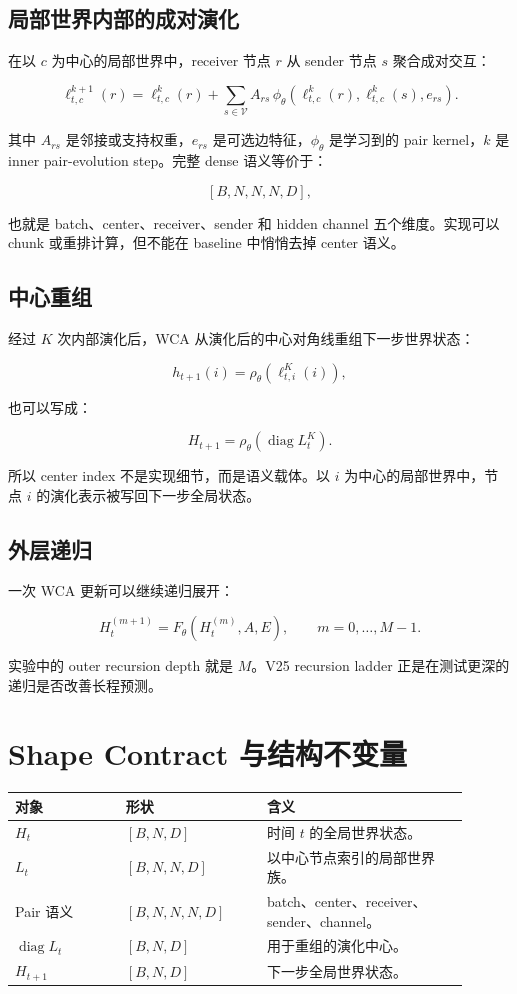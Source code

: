 \documentclass[11pt]{article}
\newcommand{\V}{\mathcal{V}}
\newcommand{\diag}{\operatorname{diag}}
\begin{document}
\subsection{局部世界内部的成对演化}

在以 $c$ 为中心的局部世界中，receiver 节点 $r$ 从 sender 节点 $s$ 聚合成对交互：

\[
\ell^{k+1}_{t,c}(r)
=
\ell^{k}_{t,c}(r)
+
\sum_{s\in \V}
A_{rs}\,
\phi_\theta
\left(
\ell^{k}_{t,c}(r),
\ell^{k}_{t,c}(s),
e_{rs}
\right).
\]

其中 $A_{rs}$ 是邻接或支持权重，$e_{rs}$ 是可选边特征，$\phi_\theta$ 是学习到的 pair kernel，$k$ 是 inner pair-evolution step。完整 dense 语义等价于：

\[
[B,N,N,N,D],
\]

也就是 batch、center、receiver、sender 和 hidden channel 五个维度。实现可以 chunk 或重排计算，但不能在 baseline 中悄悄去掉 center 语义。

\subsection{中心重组}

经过 $K$ 次内部演化后，WCA 从演化后的中心对角线重组下一步世界状态：

\[
h_{t+1}(i)
=
\rho_\theta\left(\ell^{K}_{t,i}(i)\right),
\]

也可以写成：

\[
H_{t+1}
=
\rho_\theta\left(\diag L_t^K\right).
\]

所以 center index 不是实现细节，而是语义载体。以 $i$ 为中心的局部世界中，节点 $i$ 的演化表示被写回下一步全局状态。

\subsection{外层递归}

一次 WCA 更新可以继续递归展开：

\[
H_{t}^{(m+1)}
=
F_\theta\left(H_t^{(m)}, A, E\right),
\qquad
m=0,\ldots,M-1.
\]

实验中的 outer recursion depth 就是 $M$。V25 recursion ladder 正是在测试更深的递归是否改善长程预测。

\section{Shape Contract 与结构不变量}

\begin{longtable}{p{0.22\linewidth}p{0.28\linewidth}p{0.40\linewidth}}
\toprule
对象 & 形状 & 含义 \\
\midrule
$H_t$ & $[B,N,D]$ & 时间 $t$ 的全局世界状态。 \\
$L_t$ & $[B,N,N,D]$ & 以中心节点索引的局部世界族。 \\
Pair 语义 & $[B,N,N,N,D]$ & batch、center、receiver、sender、channel。 \\
$\diag L_t$ & $[B,N,D]$ & 用于重组的演化中心。 \\
$H_{t+1}$ & $[B,N,D]$ & 下一步全局世界状态。 \\
\bottomrule
\end{longtable}
\end{document}
